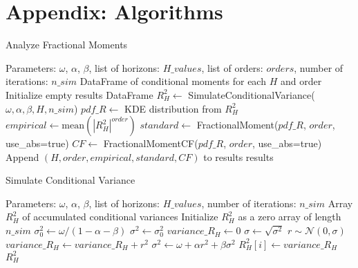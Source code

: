 \section{Appendix: Algorithms}\label{s:app_alg}
\begin{algorithm}[H]
\caption{Analyze Fractional Moments}
\label{alg:analyse_fractional_moments}
\begin{algorithmic}[1]
\REQUIRE Parameters: $\omega$, $\alpha$, $\beta$, list of horizons: $H\_values$, list of orders: $orders$, number of iterations: $n\_sim$
\ENSURE DataFrame of conditional moments for each $H$ and order
\STATE Initialize empty results DataFrame
    \STATE $R_{H}^{2} \leftarrow$ SimulateConditionalVariance($\omega, \alpha, \beta, H, n\_sim$)
    \STATE $pdf\_R \leftarrow$ KDE distribution from $R_H^2$
        \STATE $empirical \leftarrow \text{mean}(|R_H^2|^{order})$
        \STATE $standard \leftarrow$ FractionalMoment($pdf\_R$, $order$, use\_abs=true)
        \STATE $CF \leftarrow$ FractionalMomentCF($pdf\_R$, $order$, use\_abs=true)
        \STATE Append $(H, order, empirical, standard, CF)$ to results
    \ENDFOR
\ENDFOR
\RETURN results
\end{algorithmic}
\end{algorithm}

\begin{algorithm}
\caption{Simulate Conditional Variance}
\label{alg:simulate_conditional_variance}
\begin{algorithmic}[1]
\REQUIRE Parameters: $\omega$, $\alpha$, $\beta$, list of horizons: $H\_values$, number of iterations: $n\_sim$
\ENSURE Array $R_H^2$ of accumulated conditional variances
\STATE Initialize $R_H^2$ as a zero array of length $n\_sim$
\STATE $\sigma_0^2 \leftarrow \omega / (1 - \alpha - \beta)$
    \STATE $\sigma^2 \leftarrow \sigma_0^2$
    \STATE $variance\_R_H \leftarrow 0$
        \STATE $\sigma \leftarrow \sqrt{\sigma^2}$
        \STATE $r \sim \mathcal{N}(0, \sigma)$
        \STATE $variance\_R_H \leftarrow variance\_R_H + r^2$
        \STATE $\sigma^2 \leftarrow \omega + \alpha r^2 + \beta \sigma^2$
    \ENDFOR
    \STATE $R_H^2[i] \leftarrow variance\_R_H$
\ENDFOR
\RETURN $R_H^2$
\end{algorithmic}
\end{algorithm}


